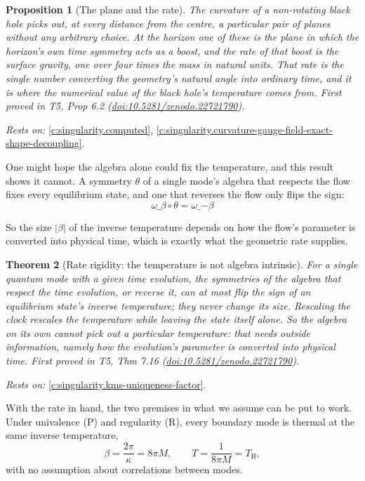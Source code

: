 \documentclass[11pt]{article}
\newtheorem{theorem}{Theorem}[section]
\newtheorem{proposition}[theorem]{Proposition}
\theoremstyle{definition}
\theoremstyle{plain}
\providecommand{\TH}{}\renewcommand{\TH}{T_{\mathrm{H}}}
\begin{document}
\begin{proposition}[The plane and the rate]\label{c:singularity.plane-rate}
The curvature of a non-rotating black hole picks out, at every distance from the centre, a particular pair of planes without any arbitrary choice. At the horizon one of these is the plane in which the horizon's own time symmetry acts as a boost, and the rate of that boost is the surface gravity, one over four times the mass in natural units. That rate is the single number converting the geometry's natural angle into ordinary time, and it is where the numerical value of the black hole's temperature comes from.
\emph{First proved in} T5, Prop 6.2 (\href{https://doi.org/10.5281/zenodo.22721790}{doi:10.5281/zenodo.22721790}).
\end{proposition}
\noindent\emph{Rests on:} \ref{c:singularity.computed}, \ref{c:singularity.curvature-gauge-field-exact-shape-decoupling}.

One might hope the algebra alone could fix the temperature, and this result shows it cannot. A symmetry $\theta$ of a single mode's algebra that respects the flow fixes every equilibrium state, and one that reverses the flow only flips the sign: \[ \omega\_\beta \circ \theta = \omega\_{-\beta} \]

So the size $|\beta|$ of the inverse temperature depends on how the flow's parameter is converted into physical time, which is exactly what the geometric rate supplies.

\begin{theorem}[Rate rigidity: the temperature is not algebra intrinsic]\label{c:singularity.rate-rigidity-temperature-not-algebra-intrinsic}
For a single quantum mode with a given time evolution, the symmetries of the algebra that respect the time evolution, or reverse it, can at most flip the sign of an equilibrium state's inverse temperature; they never change its size. Rescaling the clock rescales the temperature while leaving the state itself alone. So the algebra on its own cannot pick out a particular temperature: that needs outside information, namely how the evolution's parameter is converted into physical time.
\emph{First proved in} T5, Thm 7.16 (\href{https://doi.org/10.5281/zenodo.22721790}{doi:10.5281/zenodo.22721790}).
\end{theorem}
\noindent\emph{Rests on:} \ref{c:singularity.kms-uniqueness-factor}.

With the rate in hand, the two premises in what we assume can be put to work. Under univalence (P) and regularity (R), every boundary mode is thermal at the same inverse temperature, \[ \beta = \frac{2\pi}{\kappa} = 8\pi M , \qquad T = \frac{1}{8\pi M} = \TH , \] with no assumption about correlations between modes.
\end{document}
